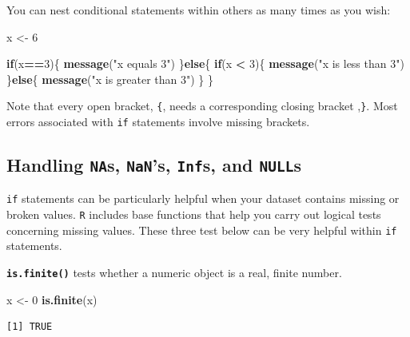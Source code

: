 \documentclass[
]{book}
\newenvironment{Shaded}{\begin{snugshade}}{\end{snugshade}}
\newcommand{\ControlFlowTok}[1]{\textcolor[rgb]{0.13,0.29,0.53}{\textbf{#1}}}
\newcommand{\DecValTok}[1]{\textcolor[rgb]{0.00,0.00,0.81}{#1}}
\newcommand{\KeywordTok}[1]{\textcolor[rgb]{0.13,0.29,0.53}{\textbf{#1}}}
\newcommand{\NormalTok}[1]{#1}
\newcommand{\OperatorTok}[1]{\textcolor[rgb]{0.81,0.36,0.00}{\textbf{#1}}}
\newcommand{\StringTok}[1]{\textcolor[rgb]{0.31,0.60,0.02}{#1}}
\begin{document}
You can nest conditional statements within others as many times as you wish:

\begin{Shaded}
\begin{Highlighting}[]
\NormalTok{x <-}\StringTok{ }\DecValTok{6}

\ControlFlowTok{if}\NormalTok{(x}\OperatorTok{==}\DecValTok{3}\NormalTok{)\{}
  \KeywordTok{message}\NormalTok{(}\StringTok{"x equals 3"}\NormalTok{)}
\NormalTok{\}}\ControlFlowTok{else}\NormalTok{\{}
  \ControlFlowTok{if}\NormalTok{(x }\OperatorTok{<}\StringTok{ }\DecValTok{3}\NormalTok{)\{}
    \KeywordTok{message}\NormalTok{(}\StringTok{"x is less than 3"}\NormalTok{)}
\NormalTok{  \}}\ControlFlowTok{else}\NormalTok{\{  }
    \KeywordTok{message}\NormalTok{(}\StringTok{"x is greater than 3"}\NormalTok{)}
\NormalTok{  \}}
\NormalTok{\}}
\end{Highlighting}
\end{Shaded}

Note that every open bracket, \texttt{\{}, needs a corresponding closing bracket ,\texttt{\}}. Most errors associated with \texttt{if} statements involve missing brackets.

\hypertarget{handling-nas-nans-infs-and-nulls}{%
\subsection*{\texorpdfstring{Handling \texttt{NA}s, \texttt{NaN}'s, \texttt{Inf}s, and \texttt{NULL}s}{Handling NAs, NaN's, Infs, and NULLs}}\label{handling-nas-nans-infs-and-nulls}}

\texttt{if} statements can be particularly helpful when your dataset contains missing or broken values. \texttt{R} includes base functions that help you carry out logical tests concerning missing values. These three test below can be very helpful within \texttt{if} statements.

\textbf{\texttt{is.finite()}} tests whether a numeric object is a real, finite number.

\begin{Shaded}
\begin{Highlighting}[]
\NormalTok{x <-}\StringTok{ }\DecValTok{0}
\KeywordTok{is.finite}\NormalTok{(x)}
\end{Highlighting}
\end{Shaded}

\begin{verbatim}
[1] TRUE
\end{verbatim}
\end{document}

